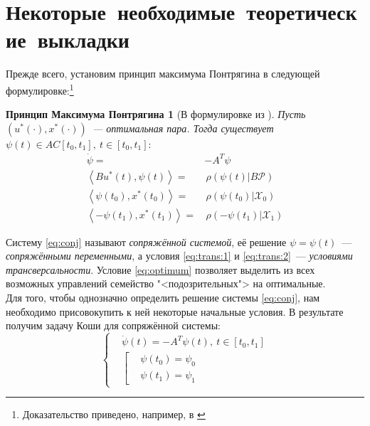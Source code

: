 \documentclass[11pt, oneside, final]{article}
\theoremstyle{break}
\newtheorem*{PMP}{Принцип Максимума Понтрягина}
\numberwithin{equation}{section}
\theoremstyle{plain}
\theoremstyle{definition}
\newcommand{\scalar}[2]{\left< #1, #2\right>}
\begin{document}
    \section{Некоторые~необходимые~теоретические~выкладки}
    \label{sec:theory}
    Прежде всего, установим принцип максимума Понтрягина в следующей формулировке:\footnote{Доказательство приведено, например, в \cite{Pontr'yaginEtAl:maximum}}
    \begin{PMP}[В формулировке из \cite{RoublevTochilin:matlab}]
        \label{th:max}
        Пусть \((u^{*}(\cdot), x^{*}(\cdot))\)~--- оптимальная пара. Тогда существует \(\psi(t) \in AC[t_0, t_1],\: t \in [t_0, t_1]\!: \)
        \begin{align}
            \dot \psi =& -\!A^{T}\psi \label{eq:conj} \\
            \scalar{Bu^{*}(t)}{\psi(t)} =& \, \rho(\psi(t)|B\mathcal{P}) \label{eq:optimum} \\ 
            \scalar{\psi(t_0)}{x^{*}(t_0)} =& \, \rho(\psi(t_0)|\mathcal{X}_0) \label{eq:trans:1} \\
            \scalar{-\psi(t_1)}{x^{*}(t_1)} =& \, \rho(-\psi(t_1)|\mathcal{X}_1) \label{eq:trans:2}            
        \end{align}
    \end{PMP}
    \noindent Систему \eqref{eq:conj} называют \emph{сопряжённой системой}, её решение \(\psi = \psi(t)\)~--- \emph{сопряжёнными переменными}, а условия \eqref{eq:trans:1} и \eqref{eq:trans:2}~--- \emph{условиями трансверсальности}. Условие \eqref{eq:optimum} позволяет выделить из всех возможных управлений семейство "<подозрительных">  на оптимальные. \\
    Для того, чтобы однозначно определить решение системы \eqref{eq:conj}, нам необходимо присовокупить к ней некоторые начальные условия. В результате получим задачу Коши
    для сопряжённой системы:
    \begin{equation}
        \left\{
        \label{eq:cauchy}
        \begin{aligned}
            & \dot \psi(t) = -\!A^{T}\psi(t), \ t \in [t_0, t_1] \\
            &\left[
            \begin{aligned}
                & \psi(t_0) = \psi_0 \\
                & \psi(t_1) = \psi_1
            \end{aligned}
            \right.
        \end{aligned}
        \right.
    \end{equation} 
\end{document}
